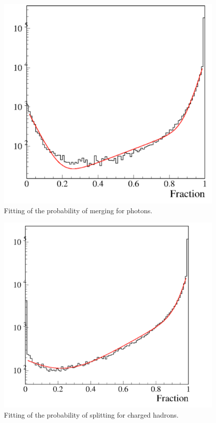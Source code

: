 \documentclass[a4paper,12pt]{article}
\begin{document}
\noindent
\begin{minipage}{\linewidth}
\centering
\begin{minipage}{0.4\linewidth}
\begin{figure}[H]
   \includegraphics[width=\linewidth]{photon_loss_para.png} 
    \caption{Fitting of the probability of merging for photons.}
   \label{fig:proba_para}
\end{figure}
\end{minipage}
      \hspace{0.05\linewidth}
      \begin{minipage}{0.4\linewidth}
\begin{figure}[H]
    \includegraphics[width=\linewidth]{had_cha_dc_para.png} 
      \caption{Fitting of the probability of splitting for charged hadrons.}
   \label{fig:proba_para2}
\end{figure}
\end{minipage}
\end{minipage}\\[0.4cm]
\end{document}
